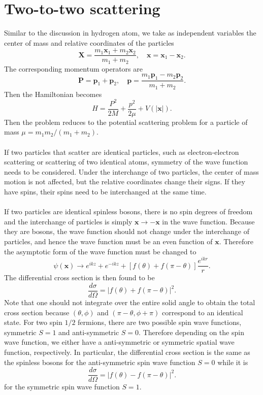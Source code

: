 \section{Two-to-two scattering}
Similar to the discussion in hydrogen atom, we take as independent variables the center of mass and relative coordinates of the particles
\[\bm{X} = \frac{m_1\bm{x}_1 + m_2\bm{x}_2}{m_1+m_2} , \quad \bm{x} = \bm{x}_1-\bm{x}_2.\]
The corresponding momentum operators are
\[\bm{P} = \bm{p}_1 + \bm{p}_2 , \quad \bm{p} = \frac{m_1\bm{p}_1-m_2\bm{p}_2}{m_1 + m_2}.\]
Then the Hamiltonian becomes
\[H = \frac{P^2}{2M} + \frac{p^2}{2\mu} + V(|\bm{x}|).\]
Then the problem reduces to the potential scattering problem for a particle of mass $\mu = m_1m_2/(m_1+m_2)$.
\\ \\
If two particles that scatter are identical particles, such as electron-electron scattering or scattering of two identical atoms, symmetry of the wave function needs to be considered.
Under the interchange of two particles, the center of mass motion is not affected, but the relative coordinates change their signs. If they have spins, their spins need to be interchanged at the same time.
\\ \\
If two particles are identical spinless bosons, there is no spin degrees of freedom and the interchange of particles is simply $\bm{x} \to -\bm{x}$ in the wave function. 
Because they are bosons, the wave function should not change under the interchange of particles, and hence the wave function must be an even function of $\bm{x}$. 
Therefore the asymptotic form of the wave function must be changed to
\[\psi(\bm{x}) \to e^{ikz} + e^{-ikz} + [f(\theta) + f(\pi - \theta)] \frac{e^{ikr}}{r}.\]
The differential cross section is then found to be
\[\frac{d\sigma}{d\Omega} = |f(\theta)+f(\pi-\theta)|^2.\]
Note that one should not integrate over the entire solid angle to obtain the total cross section because $(\theta,\phi)$ and $(\pi - \theta,\phi+\pi)$ correspond to an identical state.
For two spin ${1}/{2}$ fermions, there are two possible spin wave functions, symmetric $S = 1$ and anti-symmetric $S = 0$.
Therefore depending on the spin wave function, we either have a anti-symmetric or symmetric spatial wave function, respectively. In particular, the differential cross section is the same as the spinless bosons for the anti-symmetric spin wave function $S= 0 $ while it is
\[\frac{d\sigma}{d\Omega} = |f(\theta) - f(\pi-\theta)|^2.\]
for the symmetric spin wave function $S = 1$.

